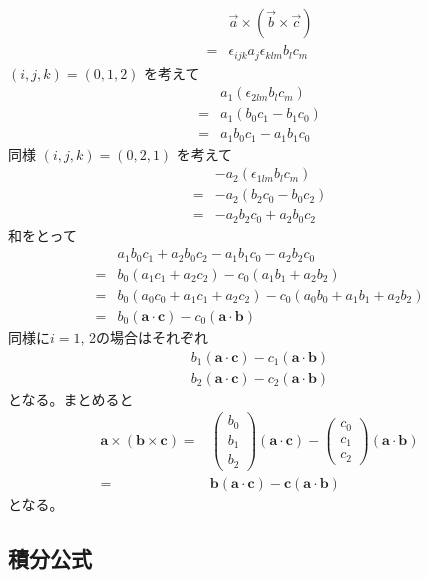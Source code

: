 \begin{align}
&\vec{a}\times\left(\vec{b}\times\vec{c}\right)\\
=&\epsilon_{ijk}a_j\epsilon_{klm}b_lc_m
\end{align}
$\left(i,j,k\right)=\left(0,1,2\right)$
を考えて
\begin{align}
&a_1\left(\epsilon_{2lm}b_lc_m\right)\\
=&a_1\left(b_0c_1-b_1c_0\right)\\
=&a_1b_0c_1-a_1b_1c_0
\end{align}
同様
$\left(i,j,k\right)=\left(0,2,1\right)$
を考えて
\begin{align}
&-a_2\left(\epsilon_{1lm}b_lc_m\right)\\
=&-a_2\left(b_2c_0-b_0c_2\right)\\
=&-a_2b_2c_0+a_2b_0c_2
\end{align}
和をとって
\begin{align}
&a_1b_0c_1+a_2b_0c_2-a_1b_1c_0-a_2b_2c_0\\
=&b_0\left(a_1c_1+a_2c_2\right)-c_0\left(a_1b_1+a_2b_2\right)\\
=&b_0\left(a_0c_0+a_1c_1+a_2c_2\right)-c_0\left(a_0b_0+a_1b_1+a_2b_2\right)\\
=&b_0\left(\bm{a}\cdot\bm{c}\right)-c_0\left(\bm{a}\cdot\bm{b}\right)
\end{align}
同様に$i=1$, 2の場合はそれぞれ
\begin{align}
b_1\left(\bm{a}\cdot\bm{c}\right)
-c_1\left(\bm{a}\cdot\bm{b}\right)\\
b_2\left(\bm{a}\cdot\bm{c}\right)
-c_2\left(\bm{a}\cdot\bm{b}\right)
\end{align}
となる。まとめると
\begin{align}
\bm{a}\times\left(\bm{b}\times\bm{c}\right)
=&\left(\begin{array}{c}b_0\\b_1\\b_2\end{array}\right)\left(\bm{a}\cdot\bm{c}\right)
-\left(\begin{array}{c}c_0\\c_1\\c_2\end{array}\right)\left(\bm{a}\cdot\bm{b}\right)\\
=&\bm{b}\left(\bm{a}\cdot\bm{c}\right)
-\bm{c}\left(\bm{a}\cdot\bm{b}\right)
\end{align}
となる。

\subsection{積分公式}

